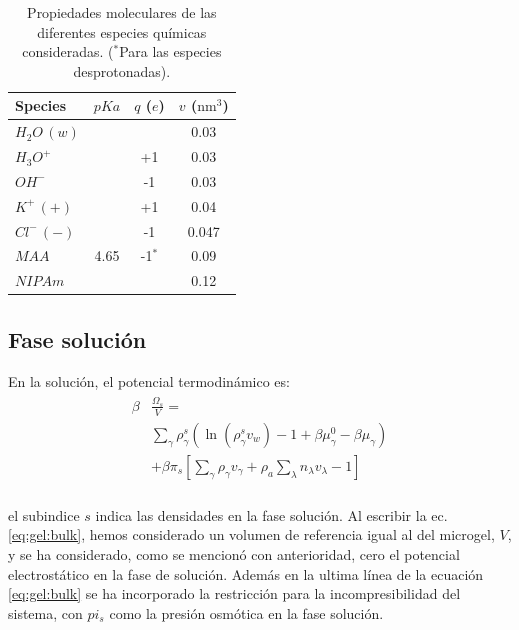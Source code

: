 \begin{table}
	\centering
\begin{tabular}{|lccc|}
    \hline
    {Species} & {$pKa$} & {$q$ ($e$)} & {$v$ ($\text{nm}^3$)} \\
      \hline
$H_2O\,(w)$ & ~ & ~ & 0.03\\
$H_3O^+$ & ~ & +1 & 0.03\\
$OH^-$ & ~ & -1 & 0.03\\
$K^+\,(+)$ & ~ & +1 & 0.04\\ 
$Cl^-\,(-)$ & ~ & -1 & 0.047\\
$MAA$ & 4.65 & -1$^\ast$ & 0.09\\
$NIPAm$ & ~ & ~ & 0.12\\
    \hline
  \end{tabular}
 \caption{Propiedades moleculares de las diferentes especies qu\'imicas consideradas.
 	\footnotesize ($^\ast$Para las especies desprotonadas).}
\label{table:molecules} 
\end{table}


\subsection{Fase soluci\'on}

En la soluci\'on, el potencial termodin\'amico es:
%
%
\begin{align}
\begin{aligned}
\beta&\frac{\Omega_s}{V}=\\& \sum_{\gamma   } {\rho^s_\gamma\left(\ln(\rho_\gamma^sv_w) -1 + \beta\mu_\gamma^0 - \beta\mu_\gamma\right)} \\
& +\beta\pi_{s} \left[ \sum_{\gamma } \rho_\gamma v_\gamma + \rho_a \sum_\lambda n_\lambda v_\lambda -1 \right] \\
\end{aligned}
\label{eq:gel:bulk}
\end{align}

\noindent el subindice  $s$  indica las densidades en la fase soluci\'on.
Al escribir la ec. \ref{eq:gel:bulk}, hemos considerado un volumen de referencia igual al del microgel, $V$, y se ha considerado, como se mencion\'o con anterioridad, cero el potencial electrost\'atico en la fase de soluci\'on.
Adem\'as en la ultima l\'inea de la ecuaci\'on \ref{eq:gel:bulk} se ha incorporado la restricci\'on para la incompresibilidad del sistema, con $pi_s$ como la presi\'on osm\'otica en la fase soluci\'on.

